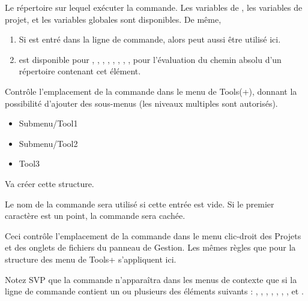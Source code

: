 
Le répertoire sur lequel exécuter la commande. Les variables de \codeblocks, les variables de projet, et les variables globales sont disponibles. De même,

\begin{enumerate}
\item Si  est entré dans la ligne de commande, alors  peut aussi être utilisé ici.
\item {} est disponible pour , , , , , , , , pour l'évaluation du chemin absolu d'un répertoire contenant cet élément.
\end{enumerate}


Contrôle l'emplacement de la commande dans le menu de Tools(+), donnant la possibilité d'ajouter des sous-menus (les niveaux multiples sont autorisés).

\begin{itemize}
  \item Submenu/Tool1
  \item Submenu/Tool2
  \item Tool3
\end{itemize}

Va créer cette structure.


Le nom de la commande sera utilisé si cette entrée est vide. Si le premier caractère est un point, la commande sera cachée.


Ceci contrôle l'emplacement de la commande dans le menu clic-droit des Projets et des onglets de fichiers du panneau de Gestion. Les mêmes règles que pour la structure des menu de Tools+ s'appliquent ici.


Notez SVP que la commande n'apparaîtra dans les menus de contexte que si la ligne de commande contient un ou plusieurs des éléments suivants : , , , , , , , et .

